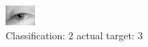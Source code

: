 \begin{figure}[h!]
\begin{center}
\includegraphics[width=0.60\columnwidth]{figures/ID2865_class_2_target_3.png}
\end{center}
\caption{ Classification: 2 actual target: 3}
\label{fig:ID2865_class_2_target_3}
\end{figure}
